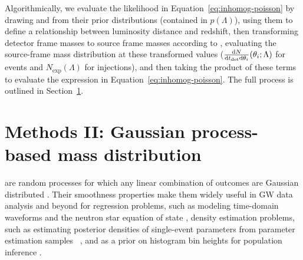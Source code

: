 \documentclass[]{aastex631}
\begin{document}
Algorithmically, we evaluate the likelihood in Equation~\ref{eq:inhomog-poisson} by drawing \Ho{} and \Omm{} from their prior distributions (contained in $p(\Lambda)$), using them to define a relationship between luminosity distance and redshift, then transforming detector frame masses to source frame masses according to , evaluating the source-frame mass distribution at these transformed values ($\frac{\text{d} N}{\text{d} t_{\det} \text{d} \theta_i} (\theta_i;\Lambda)$ for events and $N_{\text{exp}}(\Lambda)$ for injections), and then taking the product of these terms to evaluate the expression in Equation~\ref{eq:inhomog-poisson}.
The full process is outlined in Section~\ref{sec:model}.

\section{Methods II: Gaussian process-based mass distribution}
\label{sec:model}

are random processes for which any linear combination of outcomes are Gaussian distributed \citep{rasmussen_gaussian_2006}.
Their smoothness properties make them widely useful in \ac{GW} data analysis and beyond for regression problems, such as modeling time-domain waveforms \citep{doctor_statistical_2017, huerta_eccentric_2018} and the neutron star equation of state \citep{landry_nonparametric_2019}, density estimation problems, such as estimating posterior densities of single-event parameters from parameter estimation samples ~\citep{demilio_density_2021}, and as a prior on histogram bin heights for population inference \citep{mandel_model-independent_2017, li_flexible_2021, ray_non-parametric_2023}.
\end{document}
